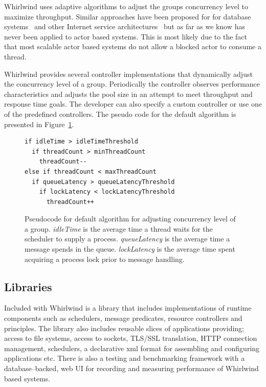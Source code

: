 \documentclass[conference]{IEEEtran}
\begin{document}
Whirlwind uses adaptive algorithms to adjust the groups concurrency level to maximize throughput. Similar approaches have been proposed for for database systems~\cite{Heiss:91:AdaptiveLoadControl} and other Internet service architectures~\cite{welsh03Adaptive} but as far as we know has never been applied to actor based systems. This is most likely due to the fact that most scalable actor based systems do not allow a blocked actor to consume a thread.

Whirlwind provides several controller implementations that dynamically adjust the concurrency level of a group. Periodically the controller observes performance characteristics and adjusts the pool size in an attempt to meet throughput and response time goals. The developer can also specify a custom controller or use one of the predefined controllers. The pseudo code for the default algorithm is presented in Figure~\ref{figure:epc}. 

\begin{figure}[ht]
\begin{verbatim}
if idleTime > idleTimeThreshold
  if threadCount > minThreadCount
    threadCount--
else if threadCount < maxThreadCount
  if queueLatency > queueLatencyThreshold
    if lockLatency < lockLatencyThreshold
      threadCount++
\end{verbatim}
\caption{Pseudocode for default algorithm for adjusting concurrency level of a group. \emph{idleTime} is the average time a thread waits for the scheduler to supply a process. \emph{queueLatency} is the average time a message spends in the queue. \emph{lockLatency} is the average time spent acquiring a process lock prior to message handling.}
\label{figure:epc}
\end{figure} 

\subsection{Libraries}

Included with Whirlwind is a library that includes implementations of runtime components such as schedulers, message predicates, resource controllers and principles. The library also includes reusable slices of applications providing; access to file systems, access to sockets, TLS/SSL translation, HTTP connection management, schedulers, a declarative xml format for assembling and configuring applications etc. There is also a testing and benchmarking framework with a database--backed, web UI for recording and measuring performance of Whirlwind based systems.
\end{document}
